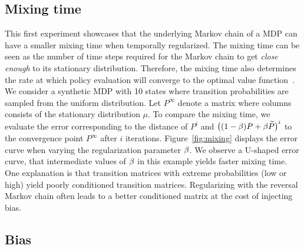 \subsection{Mixing time}
This first experiment showcases that the underlying Markov chain of a MDP can have a smaller mixing time when temporally regularized. The mixing time can be seen as the number of time steps required for the Markov chain to get \emph{close enough} to its stationary distribution. Therefore, the mixing time also determines the rate at which policy evaluation will converge to the optimal value function~\cite{baxter2001infinite}. 
We consider a synthetic MDP with 10 states where transition probabilities are sampled from the uniform distribution. Let $P^{\infty}$ denote a matrix where columns consists of the stationary distribution $\mu$. To compare the mixing time, we evaluate the error corresponding to the distance of $P^i$ and $\big((1-\beta)P+\beta \widetilde{P}\big)^i$ to the convergence point $P^{\infty}$ after $i$ iterations.
%
Figure~\ref{fig:mixing} displays the error curve when varying the regularization parameter $\beta$. We observe a U-shaped error curve, that intermediate values of $\beta$ in this example yields faster mixing time.
One explanation is that transition matrices with extreme probabilities (low or high) yield poorly conditioned transition matrices. Regularizing with the reversal Markov chain often leads to a better conditioned matrix at the cost of injecting bias.

\subsection{Bias}
\label{sec:expe:bias}

